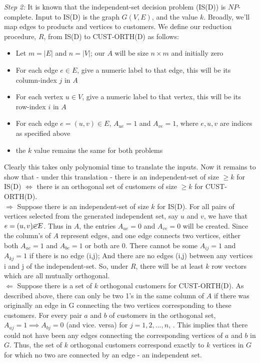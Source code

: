\documentclass[10pt, letterpaper, twosided]{article}
\begin{document}
\textit{Step 2:}
It is known that the independent-set decision problem (IS(D)) is $NP$-complete. Input to IS(D) is the graph $G(V,E)$,
and the value $k$. Broadly, we'll map edges to products and vertices to customers.
We define our reduction procedure, $R$, from IS(D) to CUST-ORTH(D) as follows:
\begin{itemize}
\item Let $m=|E|$ and $n=|V|$; our $A$ will be size $n \times m$ and initially zero
\item For each edge $e \in E$, give a numeric label to that edge, this will be its column-index $j$ in $A$
\item For each vertex $u \in V$, give a numeric label to that vertex, this will be its row-index $i$ in $A$
\item For each edge $e=(u,v) \in E$, $A_{ue}=1$ and $A_{ve}=1$, where $e,u,v$ are indices as specified above
\item the $k$ value remains the same for both problems
\end{itemize}
Clearly this takes only polynomial time to translate the inputs.  Now it remains to show that - under this translation - 
there is an independent-set of size $\geq k$ for IS(D) $\iff$ there is an orthogonal set of customers of size $\geq k$ 
for CUST-ORTH(D).\\

$\Longrightarrow$ Suppose there is an independent-set of size $k$ for IS(D).  For all pairs of vertices selected from the generated independent set, say $u$ and $v$, we have that $e=(u,v) \cancel{\in} E$.  Thus in $A$, the entries 
$A_{ue}=0$ and $A_{ve}=0$ will be created.  Since the column's of $A$ represent edges, 
and one edge connects two vertices, either both $A_{ae}=1$ and $A_{be}=1$ or both are 0. There 
cannot be some $A_{ij}=1$ and $A_{kj}=1$ if there is no edge (i,j); And there are no edges (i,j) 
between any vertices i and j of the independent-set.  So, under $R$, there will be at least $k$ row vectors which are all mutually orthogonal.\\

$\Longleftarrow$ Suppose there is a set of $k$ orthogonal customers for CUST-ORTH(D).  As described above, there can
only be two 1's in the same column of $A$ if there was originally an edge in G connecting the two vertices corresponding to
these customers.  For every pair $a$ and $b$ of customers in the orthogonal set, $A_{aj}=1 \implies A_{bj}=0$ (and vice. versa) for $j=1,2,...,n$, .  This implies that there could not have been any edges connecting the corresponding vertices of $a$ and $b$ in $G$.  Thus, the set of $k$ orthogonal customers correspond exactly to $k$ vertices in $G$ for which no two are connected by an edge - an independent set.\\
\end{document}
